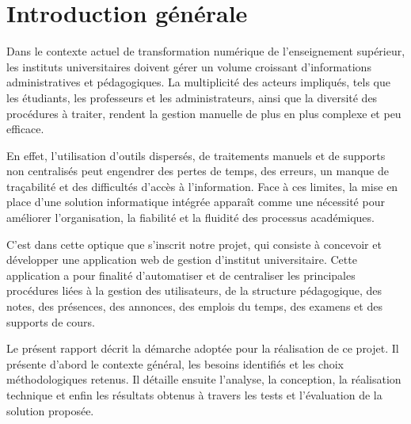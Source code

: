 \documentclass[12pt,a4paper]{report}
\begin{document}
\tableofcontents
\newpage

\listoffigures
\newpage

\listoftables
\newpage
\chapter*{Introduction générale}

Dans le contexte actuel de transformation numérique de l'enseignement supérieur, les instituts universitaires doivent gérer un volume croissant d'informations administratives et pédagogiques. La multiplicité des acteurs impliqués, tels que les étudiants, les professeurs et les administrateurs, ainsi que la diversité des procédures à traiter, rendent la gestion manuelle de plus en plus complexe et peu efficace.

En effet, l'utilisation d'outils dispersés, de traitements manuels et de supports non centralisés peut engendrer des pertes de temps, des erreurs, un manque de traçabilité et des difficultés d'accès à l'information. Face à ces limites, la mise en place d'une solution informatique intégrée apparaît comme une nécessité pour améliorer l'organisation, la fiabilité et la fluidité des processus académiques.

C'est dans cette optique que s'inscrit notre projet, qui consiste à concevoir et développer une application web de gestion d'institut universitaire. Cette application a pour finalité d'automatiser et de centraliser les principales procédures liées à la gestion des utilisateurs, de la structure pédagogique, des notes, des présences, des annonces, des emplois du temps, des examens et des supports de cours.

Le présent rapport décrit la démarche adoptée pour la réalisation de ce projet. Il présente d'abord le contexte général, les besoins identifiés et les choix méthodologiques retenus. Il détaille ensuite l'analyse, la conception, la réalisation technique et enfin les résultats obtenus à travers les tests et l'évaluation de la solution proposée.
\end{document}
